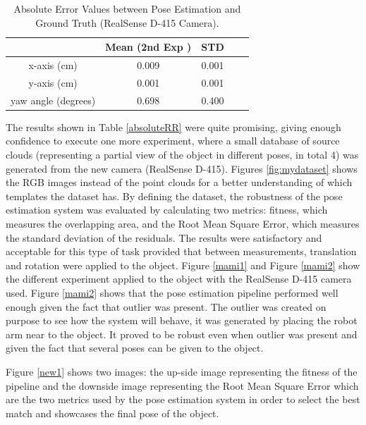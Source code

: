 \begin{table}[ht]
\renewcommand{\arraystretch}{1.3}
\caption{Absolute Error Values between Pose Estimation and Ground Truth (RealSense D-415 Camera).}
\label{abso}
\centering
\begin{tabular}{|c|c|c|c|c|}
\hline
  & Mean (2nd Exp )& STD \\
\hline
x-axis (cm) & 0.009 & 0.001
 \\
\hline
y-axis (cm) & 0.001 & 0.001  \\
\hline
yaw angle (degrees)& 0.698 & 0.400 \\
\hline
\end{tabular}
\end{table}

The results shown in Table \ref{absoluteRR} were quite promising, giving enough confidence to execute one more experiment, where a small database of source clouds (representing a partial view of the object in different poses, in total 4) was generated from the new camera (RealSense D-415). Figures \ref{fig:mydataset} shows the RGB images instead of the point clouds for a better understanding of which templates the dataset has. By defining the dataset, the robustness of the pose estimation system was evaluated by calculating two metrics: fitness, which measures the overlapping area, and the Root Mean Square Error, which measures the standard deviation of the residuals. The results were satisfactory and acceptable for this type of task provided that between measurements, translation and rotation were applied to the object. Figure \ref{mami1} and Figure \ref{mami2} show the different experiment applied to the object with the RealSense D-415 camera used. Figure \ref{mami2} shows that the pose estimation pipeline performed well enough given the fact that outlier was present. The outlier was created on purpose to see how the system will behave, it was generated by placing the robot arm near to the object. It proved to be robust even when outlier was present and given the fact that several poses can be given to the object.  

Figure \ref{new1} shows two images: the up-side image representing the fitness of the pipeline and the downside image representing the Root Mean Square Error which are the two metrics used by the pose estimation system in order to select the best match and showcases the final pose of the object.

